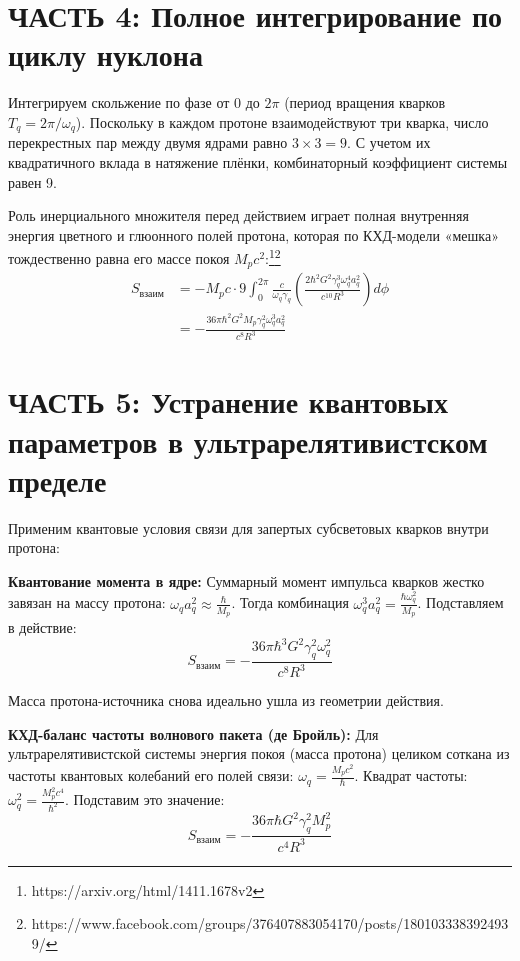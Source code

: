 \documentclass[12pt,a4paper]{article}
\begin{document}
\section*{ЧАСТЬ 4: Полное интегрирование по циклу нуклона}

Интегрируем скольжение по фазе от $0$ до $2\pi$ (период вращения кварков $T_q = 2\pi/\omega_q$). Поскольку в каждом протоне взаимодействуют три кварка, число перекрестных пар между двумя ядрами равно $3 \times 3 = 9$. С учетом их квадратичного вклада в натяжение плёнки, комбинаторный коэффициент системы равен 9.

Роль инерциального множителя перед действием играет полная внутренняя энергия цветного и глюонного полей протона, которая по КХД-модели «мешка» тождественно равна его массе покоя $M_p c^2$:\footnote{https://arxiv.org/html/1411.1678v2}\footnote{https://www.facebook.com/groups/376407883054170/posts/1801033383924939/}
\begin{align}
S_{взаим} &= - M_p c \cdot 9 \int_0^{2\pi} \frac{c}{\omega_q \gamma_q} \left( \frac{2 \hbar^2 G^2 \gamma_q^3 \omega_q^4 a_q^2}{c^{10} R^3} \right) d\phi \\
&= - \frac{36\pi \hbar^2 G^2 M_p \gamma_q^2 \omega_q^3 a_q^2}{c^8 R^3}
\end{align}

\section*{ЧАСТЬ 5: Устранение квантовых параметров в ультрарелятивистском пределе}

Применим квантовые условия связи для запертых субсветовых кварков внутри протона:

\textbf{Квантование момента в ядре:} Суммарный момент импульса кварков жестко завязан на массу протона: $\omega_q a_q^2 \approx \frac{\hbar}{M_p}$. Тогда комбинация $\omega_q^3 a_q^2 = \frac{\hbar \omega_q^2}{M_p}$. Подставляем в действие:
\begin{equation}
S_{взаим} = - \frac{36\pi \hbar^3 G^2 \gamma_q^2 \omega_q^2}{c^8 R^3}
\end{equation}

Масса протона-источника снова идеально ушла из геометрии действия.

\textbf{КХД-баланс частоты волнового пакета (де Бройль):} Для ультрарелятивистской системы энергия покоя (масса протона) целиком соткана из частоты квантовых колебаний его полей связи: $\omega_q = \frac{M_p c^2}{\hbar}$. Квадрат частоты: $\omega_q^2 = \frac{M_p^2 c^4}{\hbar^2}$. Подставим это значение:
\begin{equation}
S_{взаим} = - \frac{36\pi \hbar G^2 \gamma_q^2 M_p^2}{c^4 R^3}
\end{equation}
\end{document}
